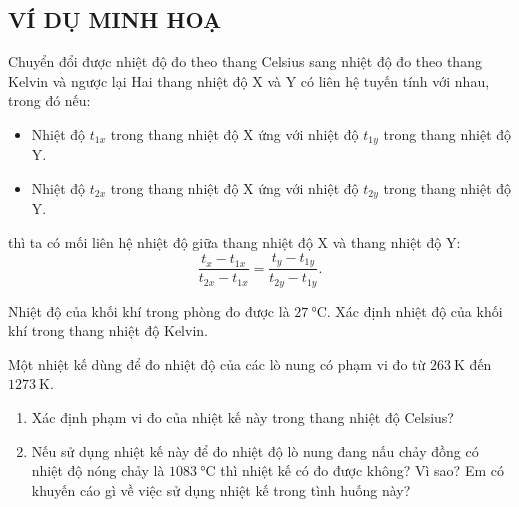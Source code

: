 \subsection{VÍ DỤ MINH HOẠ}
\begin{dang}{Chuyển đổi được nhiệt độ đo theo thang Celsius sang nhiệt độ đo theo thang Kelvin và ngược lại}
Hai thang nhiệt độ X và Y có liên hệ tuyến tính với nhau, trong đó nếu:
\begin{itemize}
	\item Nhiệt độ $t_{1x}$ trong thang nhiệt độ X ứng với nhiệt độ $t_{1y}$ trong thang nhiệt độ Y.
	\item Nhiệt độ $t_{2x}$ trong thang nhiệt độ X ứng với nhiệt độ $t_{2y}$ trong thang nhiệt độ Y.
\end{itemize}
thì ta có mối liên hệ nhiệt độ giữa thang nhiệt độ X và thang nhiệt độ Y:
$$\dfrac{t_x-t_{1x}}{t_{2x}-t_{1x}}=\dfrac{t_y-t_{1y}}{t_{2y}-t_{1y}}.$$
\end{dang}
	\begin{vd}
Nhiệt độ của khối khí trong phòng đo được là $\SI{27}{\celsius}$. Xác định nhiệt độ của khối khí trong thang nhiệt độ Kelvin.
		
	
\end{vd}

\begin{vd}
	Một nhiệt kế dùng để đo nhiệt độ của các lò nung có phạm vi đo từ $\SI{263}{\kelvin}$ đến $\SI{1273}{\kelvin}$.
	\begin{enumerate}[label=\alph*)]
		\item Xác định phạm vi đo của nhiệt kế này trong thang nhiệt độ Celsius?
		\item Nếu sử dụng nhiệt kế này để đo nhiệt độ lò nung đang nấu chảy đồng có nhiệt độ nóng chảy là $\SI{1083}{\celsius}$ thì nhiệt kế có đo được không? Vì sao? Em có khuyến cáo gì về việc sử dụng nhiệt kế trong tình huống này?
	\end{enumerate}
\end{vd}

